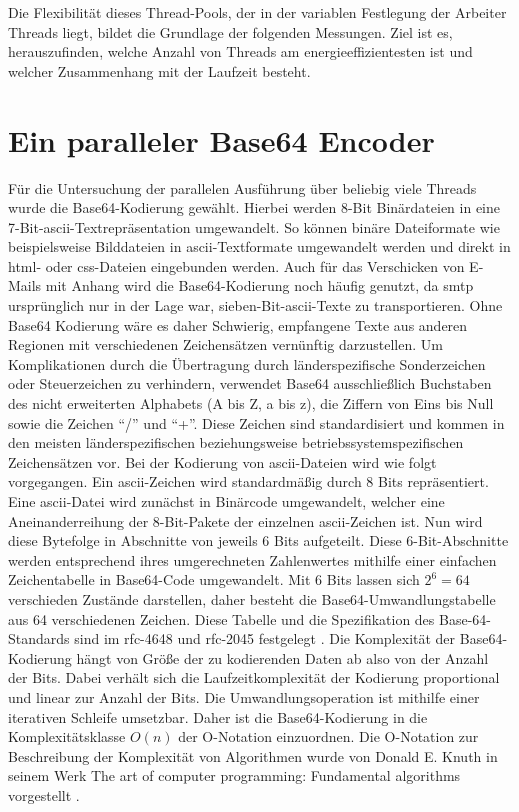 Die Flexibilität dieses Thread-Pools, der in der variablen Festlegung der Arbeiter Threads liegt, bildet die Grundlage der folgenden Messungen. Ziel ist es, herauszufinden, welche Anzahl von Threads am energieeffizientesten ist und welcher Zusammenhang mit der Laufzeit besteht.

\section{Ein paralleler Base64 Encoder}

Für die Untersuchung der parallelen Ausführung über beliebig viele Threads wurde die Base64-Kodierung gewählt. Hierbei werden 8-Bit Binärdateien in eine 7-Bit-\ac{ascii}-Textrepräsentation umgewandelt. So können binäre Dateiformate wie beispielsweise Bilddateien in \ac{ascii}-Textformate umgewandelt werden und direkt in \ac{html}- oder \ac{css}-Dateien eingebunden werden. Auch für das Verschicken von E-Mails mit Anhang wird die Base64-Kodierung noch häufig genutzt, da \ac{smtp} ursprünglich nur in der Lage war, sieben-Bit-\ac{ascii}-Texte zu transportieren. Ohne Base64 Kodierung wäre es daher Schwierig, empfangene Texte aus anderen Regionen mit verschiedenen Zeichensätzen vernünftig darzustellen. Um Komplikationen durch die Übertragung durch länderspezifische Sonderzeichen oder Steuerzeichen zu verhindern, verwendet Base64 ausschließlich Buchstaben des nicht erweiterten Alphabets (A bis Z, a bis z), die Ziffern von Eins bis Null sowie die Zeichen \enquote{/} und \enquote{+}. Diese Zeichen sind standardisiert und kommen in den meisten länderspezifischen beziehungsweise betriebssystemspezifischen Zeichensätzen vor. Bei der Kodierung von \ac{ascii}-Dateien wird wie folgt vorgegangen. Ein \ac{ascii}-Zeichen wird standardmäßig durch 8 Bits repräsentiert. Eine \ac{ascii}-Datei wird zunächst in Binärcode umgewandelt, welcher eine Aneinanderreihung der 8-Bit-Pakete der einzelnen \ac{ascii}-Zeichen ist. Nun wird diese Bytefolge in Abschnitte von jeweils 6 Bits aufgeteilt. Diese 6-Bit-Abschnitte werden entsprechend ihres umgerechneten Zahlenwertes mithilfe einer einfachen Zeichentabelle in Base64-Code umgewandelt. Mit 6 Bits lassen sich $2^{ 6 } = 64$ verschieden Zustände darstellen, daher besteht die Base64-Umwandlungstabelle aus 64 verschiedenen Zeichen. Diese Tabelle und die Spezifikation des Base-64-Standards sind im \ac{rfc}-4648 \cite{base64-rfc4648} und \ac{rfc}-2045 festgelegt \cite{base64-rfc2045}. Die Komplexität der Base64-Kodierung hängt von Größe der zu kodierenden Daten ab also von der Anzahl der Bits. Dabei verhält sich die Laufzeitkomplexität der Kodierung proportional und linear zur Anzahl der Bits. Die Umwandlungsoperation ist mithilfe einer iterativen Schleife umsetzbar. Daher ist die Base64-Kodierung in die Komplexitätsklasse $O(n)$ der O-Notation einzuordnen. Die O-Notation zur Beschreibung der Komplexität von Algorithmen wurde von Donald E. Knuth in seinem Werk \glqq The art of computer programming: Fundamental algorithms\grqq{} vorgestellt \cite[107]{knuth1}.

